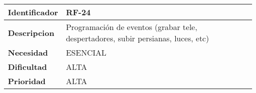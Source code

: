 \begin{center}
    \begin{tabular}{|p{2.6cm}|p{12cm}|}
    \hline
    \textbf{Identificador} & RF-24\\
    \hline
    \textbf{Descripcion} & Programación de eventos (grabar tele, despertadores, subir persianas, luces, etc)\\
    \hline
    \textbf{Necesidad} & ESENCIAL\\
    \hline
    \textbf{Dificultad} & ALTA\\
    \hline
    \textbf{Prioridad} & ALTA\\
    \hline
    \end{tabular}
\end{center}
